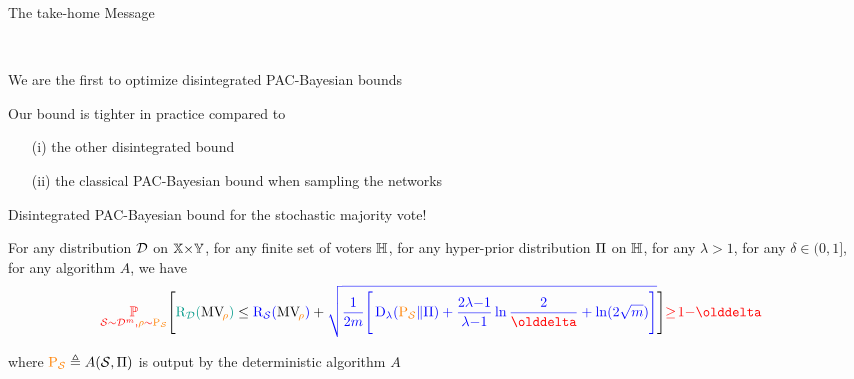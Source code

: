 \documentclass{slides}
\begin{document}
\begin{xframe}{The take-home Message}

\vfill

\\
\begin{xitemize}
    \item We are the first to optimize disintegrated PAC-Bayesian bounds\\[0.3cm]
    
    \item Our bound is tighter in practice compared to 
    \begin{enumerate}
        \item[(i)] the other disintegrated bound
        \item[(ii)] the classical PAC-Bayesian bound when sampling the networks
    \end{enumerate}
\end{xitemize}

\vspace{0.3cm}

 Disintegrated PAC-Bayesian bound for the stochastic majority vote!

\begin{redbox}{}

{\scriptsize For any distribution $\mathcal{D}$ on $\mathbb{X}{\times}\mathbb{Y}$, for any finite set of voters $\mathbb{H}$, for any hyper-prior distribution $\Pi$ on $\mathbb{H}$, for any $\lambda>1$, for any $\delta \in (0, 1]$, for any algorithm $A$, we have}\\[-0.6cm]
\begin{align*}
    &\red{\PP_{\dS\sim\D^{\m},\Q\sim \hyperAQ}}\Bigg[ 
    \green{\Risk_{\D}(\MVQ)} \le \blue{\Risk_{\dS}(\MVQ)} + \blue{\sqrt{\frac{1}{2\m}\Bigg[ \Renyi_{\lambda}(\hyperAQ\|\hyperP) + {\frac{2\lambda{-}1}{\lambda{-}1}}\ln\frac{2}{\delta} + \ln(2\sqrt{m})\Bigg]}} \Bigg] \red{\ge\! 1{-}\delta}
\end{align*}

\vspace{-0.3cm}
{\scriptsize where $\textcolor{orange}{\textcolor{orange}{\mathrm{P}}_{\mathcal{S}}} \triangleq A(\mathcal{S}, \Pi)$ is output by the deterministic algorithm $A$}
\end{redbox}


\end{xframe}

\end{document}
